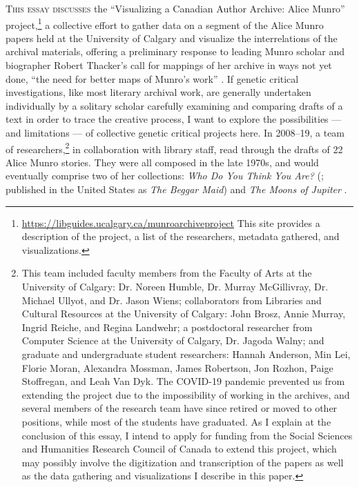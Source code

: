 \documentclass{article}
\begin{document}
\noindent \textsc{This essay discusses} the ``Visualizing a Canadian Author Archive: Alice
Munro'' project,\footnote{\url{https://libguides.ucalgary.ca/munroarchiveproject}
  This site provides a description of the project, a list of the
  researchers, metadata gathered, and visualizations.} a collective
effort to gather data on a segment of the Alice Munro papers held at the
University of Calgary and visualize the interrelations of the archival
materials, offering a preliminary response to leading Munro scholar and
biographer Robert Thacker's call for mappings of her archive in ways not
yet done, ``the need for better maps of Munro's work'' \citep[194]{thacker_reading_2016}. If
genetic critical investigations, like most literary archival work, are
generally undertaken individually by a solitary scholar carefully
examining and comparing drafts of a text in order to trace the creative
process, I want to explore the possibilities –– and limitations –– of
collective genetic critical projects here. In 2008--19, a team of researchers,\footnote{This team included faculty members
  from the Faculty of Arts at the University of Calgary: Dr. Noreen
  Humble, Dr. Murray McGillivray, Dr. Michael Ullyot, and Dr. Jason
  Wiens; collaborators from Libraries and Cultural Resources at the
  University of Calgary: John Brosz, Annie Murray, Ingrid Reiche, and
  Regina Landwehr; a postdoctoral researcher from Computer Science at
  the University of Calgary, Dr. Jagoda Walny; and graduate and
  undergraduate student researchers: Hannah Anderson, Min Lei, Florie
  Moran, Alexandra Mossman, James Robertson, Jon Rozhon, Paige
  Stoffregan, and Leah Van Dyk. The COVID-19 pandemic prevented us from
  extending the project due to the impossibility of working in the
  archives, and several members of the research team have since retired
  or moved to other positions, while most of the students have
  graduated. As I explain at the conclusion of this essay, I intend to
  apply for funding from the Social Sciences and Humanities Research
  Council of Canada to extend this project, which may possibly involve
  the digitization and transcription of the papers as well as the data
  gathering and visualizations I describe in this paper.} in collaboration with library
staff,
read through the drafts of 22 Alice Munro stories. They were all composed in the
late 1970s, and would eventually comprise two of her collections:
\emph{Who Do You Think You Are?} (\cite{munro_who_1977}; published in the United States
as \emph{The Beggar Maid}) and \emph{The Moons of Jupiter} \citep{munro_moons_1983}.
\end{document}
